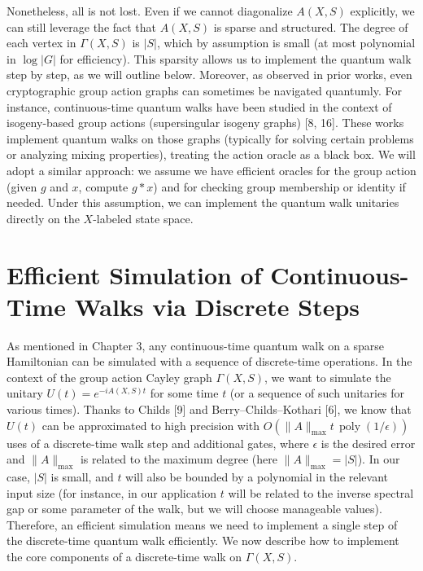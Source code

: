 \documentclass[11pt]{article}
\theoremstyle{definition}
\begin{document}
Nonetheless, all is not lost. Even if we cannot diagonalize $A(X,S)$ explicitly, we can still leverage the fact that $A(X,S)$ is sparse and structured. The degree of each vertex in $\Gamma(X,S)$ is $|S|$, which by assumption is small (at most polynomial in $\log |G|$ for efficiency). This sparsity allows us to implement the quantum walk step by step, as we will outline below. Moreover, as observed in prior works, even cryptographic group action graphs can sometimes be navigated quantumly. For instance, continuous-time quantum walks have been studied in the context of isogeny-based group actions (supersingular isogeny graphs) [8, 16]. These works implement quantum walks on those graphs (typically for solving certain problems or analyzing mixing properties), treating the action oracle as a black box. We will adopt a similar approach: we assume we have efficient oracles for the group action (given $g$ and $x$, compute $g*x$) and for checking group membership or identity if needed. Under this assumption, we can implement the quantum walk unitaries directly on the $X$-labeled state space.

\section{Efficient Simulation of Continuous-Time Walks via Discrete Steps}
As mentioned in Chapter 3, any continuous-time quantum walk on a sparse Hamiltonian can be simulated with a sequence of discrete-time operations. In the context of the group action Cayley graph $\Gamma(X,S)$, we want to simulate the unitary $U(t) = e^{-i A(X,S) t}$ for some time $t$ (or a sequence of such unitaries for various times). Thanks to Childs [9] and Berry–Childs–Kothari [6], we know that $U(t)$ can be approximated to high precision with $O(\|A\|_{\max} t\, \operatorname{poly}(1/\epsilon))$ uses of a discrete-time walk step and additional gates, where $\epsilon$ is the desired error and $\|A\|_{\max}$ is related to the maximum degree (here $\|A\|_{\max} = |S|$). In our case, $|S|$ is small, and $t$ will also be bounded by a polynomial in the relevant input size (for instance, in our application $t$ will be related to the inverse spectral gap or some parameter of the walk, but we will choose manageable values). Therefore, an efficient simulation means we need to implement a single step of the discrete-time quantum walk efficiently. We now describe how to implement the core components of a discrete-time walk on $\Gamma(X,S)$.
\end{document}
